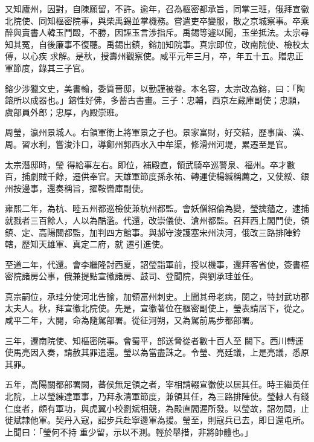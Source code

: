 \begin{pinyinscope}
 又知廬州，因對，自陳願留，不許。逾年，召為樞密都承旨，同掌三班，俄拜宣徽北院使、同知樞密院事，與柴禹錫並掌機務。嘗遣吏卒變服，散之京城察事。卒乘醉與賣書人韓玉鬥毆，不勝，因誣玉言涉指斥。禹錫等遽以聞，玉坐抵法。太宗尋知其冤，自後廉事不復聽。禹錫出鎮，鎔加知院事。真宗即位，改南院使、檢校太傅，以心疾
 求解。是秋，授壽州觀察使。咸平元年三月，卒，年五十五。贈忠正軍節度，錄其三子官。



 鎔少涉獵文史，美書翰，委質晉邸，以勤謹被眷。本名容，太宗改為鎔，曰：「陶鎔所以成器也。」鎔性好佛，多蓄古書畫。三子：忠輔，西京左藏庫副使；忠願，虞部員外郎；忠厚，內殿崇班。



 周瑩，瀛州景城人。右領軍衛上將軍景之子也。景家富財，好交結，歷事唐、漢、周。習水利，嘗浚汴口，導鄭州郭西水入中牟渠，修滑州河堤，累遷至是官。



 太宗潛邸時，瑩
 得給事左右。即位，補殿直，領武騎卒巡警泉、福州。卒才數百，捕劇賊千餘，遷供奉官。天雄軍節度孫永祐、轉運使楊緘稱薦之，又使綏、銀州按邊事，還奏稱旨，擢鞍轡庫副使。



 雍熙二年，為杭、睦五州都巡檢使兼杭州都監。會妖僧紹倫為變，瑩擒蕕之，逮捕就戮者三百餘人，人以為酷濫。代還，改崇儀使、滄州都監。召拜西上閣門使，領鎮、定、高陽關都監，加判四方館事。與郝守浚護塞宋州決河，俄改三路排陣鈐轄，歷知天雄軍、真定二府，就
 遷引進使。



 至道二年，代還。會李繼隆討西夏，詔瑩詣軍前，授以機事，還拜客省使，簽書樞密院諸房公事，俄兼提點宣徽諸房、鼓司、登聞院，與劉承珪並任。



 真宗嗣位，承珪分使河北告諭，加領富州刺史。上聞其母老病，閔之，特封武功郡太夫人。秋，拜宣徽北院使。先是，宣徽著位在樞密副使上，瑩表請居下，從之。咸平二年，大閱，命為隨駕部署。從征河朔，又為駕前馬步都部署。



 三年，遷南院使、知樞密院事。會蜀平，部送脅從者數十百人至
 闕下。西川轉運使馬亮因入奏，請赦其罪遣還。瑩以為當盡誅之。令瑩、亮廷議，上是亮議，悉原其罪。



 五年，高陽關都部署闕，蕃侯無足領之者，宰相請輟宣徽使以居其任。時王繼英任北院，上以瑩練達軍事，乃拜永清軍節度，兼領其任，為三路排陣使。瑩隸人有錢仁度者，頗有軍功，與虎翼小校劉斌相競，為殿直閻渥所發。以瑩故，詔勿問，止徙斌隸他軍。契丹入寇，詔步兵赴寧邊軍為援。瑩至，則寇兵已去，即日還屯所。上聞曰：「瑩何不持
 重少留，示以不測。輕於舉措，非將帥體也。」




\end{pinyinscope}
